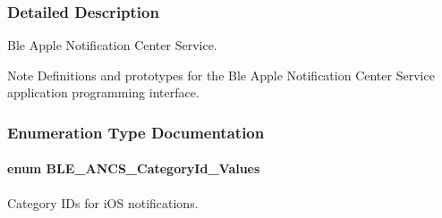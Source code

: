 \subsubsection{Detailed Description}
Ble Apple Notification Center Service. 

\begin{DoxyNote}{Note}
Definitions and prototypes for the Ble Apple Notification Center Service application programming interface. 
\end{DoxyNote}


\subsubsection{Enumeration Type Documentation}
\paragraph[{\texorpdfstring{B\+L\+E\+\_\+\+A\+N\+C\+S\+\_\+\+Category\+Id\+\_\+\+Values}{BLE_ANCS_CategoryId_Values}}]{\setlength{\rightskip}{0pt plus 5cm}enum {\bf B\+L\+E\+\_\+\+A\+N\+C\+S\+\_\+\+Category\+Id\+\_\+\+Values}}\hypertarget{group___b_l_e___a_n_c_s_ga982bbd8a00c6ecff960d5196576dbba0}{}\label{group___b_l_e___a_n_c_s_ga982bbd8a00c6ecff960d5196576dbba0}


Category I\+Ds for i\+OS notifications. 

